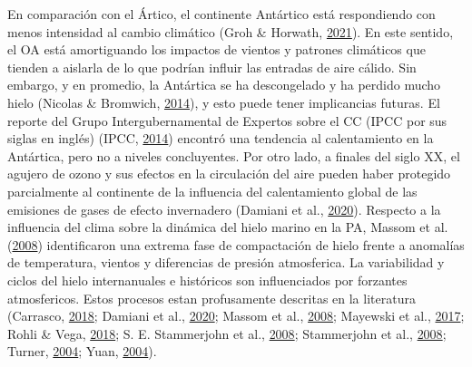 \documentclass[
]{article}
\begin{document}
En comparación con el Ártico, el continente Antártico está respondiendo
con menos intensidad al cambio climático (Groh \& Horwath,
\protect\hyperlink{ref-Groh2021}{2021}). En este sentido, el OA está
amortiguando los impactos de vientos y patrones climáticos que tienden a
aislarla de lo que podrían influir las entradas de aire cálido. Sin
embargo, y en promedio, la Antártica se ha descongelado y ha perdido
mucho hielo (Nicolas \& Bromwich,
\protect\hyperlink{ref-Nicolas2014}{2014}), y esto puede tener
implicancias futuras. El reporte del Grupo Intergubernamental de
Expertos sobre el CC (IPCC por sus siglas en inglés) (IPCC,
\protect\hyperlink{ref-IPCC2014}{2014}) encontró una tendencia al
calentamiento en la Antártica, pero no a niveles concluyentes. Por otro
lado, a finales del siglo XX, el agujero de ozono y sus efectos en la
circulación del aire pueden haber protegido parcialmente al continente
de la influencia del calentamiento global de las emisiones de gases de
efecto invernadero (Damiani et al.,
\protect\hyperlink{ref-Damiani2020}{2020}). Respecto a la influencia del
clima sobre la dinámica del hielo marino en la PA, Massom et al.
(\protect\hyperlink{ref-Massom2008}{2008}) identificaron una extrema
fase de compactación de hielo frente a anomalías de temperatura, vientos
y diferencias de presión atmosferica. La variabilidad y ciclos del hielo
internanuales e históricos son influenciados por forzantes atmosfericos.
Estos procesos estan profusamente descritas en la literatura (Carrasco,
\protect\hyperlink{ref-Carrasco2018}{2018}; Damiani et al.,
\protect\hyperlink{ref-Damiani2020}{2020}; Massom et al.,
\protect\hyperlink{ref-Massom2008}{2008}; Mayewski et al.,
\protect\hyperlink{ref-Mayewski2017}{2017}; Rohli \& Vega,
\protect\hyperlink{ref-Rohli2018}{2018}; S. E. Stammerjohn et al.,
\protect\hyperlink{ref-Stammerjohn2008}{2008}; Stammerjohn et al.,
\protect\hyperlink{ref-Stammerjohn2008a}{2008}; Turner,
\protect\hyperlink{ref-Turner2004}{2004}; Yuan,
\protect\hyperlink{ref-Yuan2004}{2004}).
\end{document}
